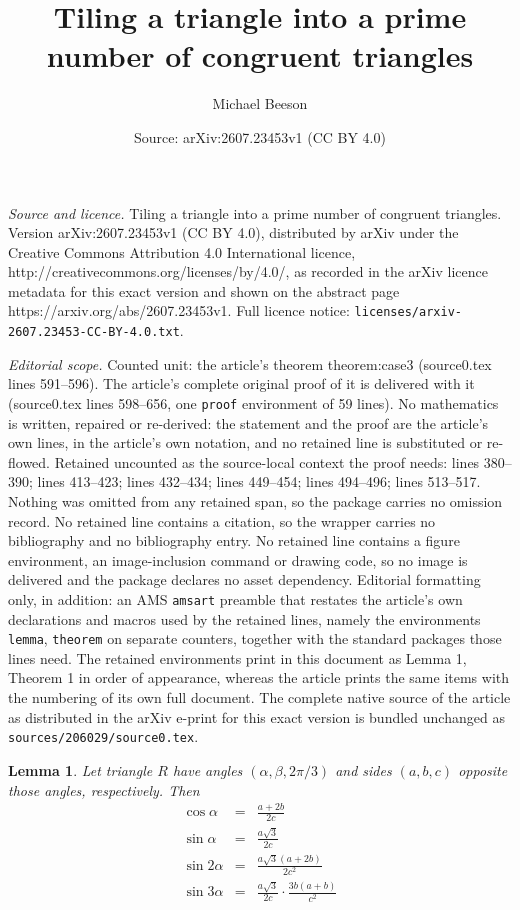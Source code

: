\documentclass[10pt,a4paper]{amsart}
\title{Tiling a triangle into a prime number of congruent triangles}
\author{Michael Beeson}
\date{Source: arXiv:2607.23453v1 (CC BY 4.0)}
\newtheorem{lemma}{Lemma}
\begin{document}
\maketitle

\noindent\emph{Source and licence.} Tiling a triangle into a prime number of congruent triangles. Version arXiv:2607.23453v1 (CC BY 4.0), distributed by arXiv under the Creative Commons Attribution 4.0 International licence, http://creativecommons.org/licenses/by/4.0/, as recorded in the arXiv licence metadata for this exact version and shown on the abstract page https://arxiv.org/abs/2607.23453v1. Full licence notice: \texttt{licenses/arxiv-2607.23453-CC-BY-4.0.txt}.\par\smallskip

\noindent\textit{Editorial scope.} Counted unit: the article's theorem theorem:case3 (source0.tex lines 591--596). The article's complete original proof of it is delivered with it (source0.tex lines 598--656, one \texttt{proof} environment of 59 lines). No mathematics is written, repaired or re-derived: the statement and the proof are the article's own lines, in the article's own notation, and no retained line is substituted or re-flowed.  Retained uncounted as the source-local context the proof needs: lines 380--390; lines 413--423; lines 432--434; lines 449--454; lines 494--496; lines 513--517.  Nothing was omitted from any retained span, so the package carries no omission record.  No retained line contains a citation, so the wrapper carries no bibliography and no bibliography entry.  No retained line contains a figure environment, an image-inclusion command or drawing code, so no image is delivered and the package declares no asset dependency.  Editorial formatting only, in addition: an AMS \texttt{amsart} preamble that restates the article's own declarations and macros used by the retained lines, namely the environments \texttt{lemma}, \texttt{theorem} on separate counters, together with the standard packages those lines need.  The retained environments print in this document as Lemma 1, Theorem 1 in order of appearance, whereas the article prints the same items with the numbering of its own full document.  The complete native source of the article as distributed in the arXiv e-print for this exact version is bundled unchanged as \texttt{sources/206029/source0.tex}.
\begin{lemma} \label{lemma:claude}
Let triangle $R$ have angles $(\alpha,\beta,2\pi/3)$ and sides $(a,b,c)$ opposite
those angles, respectively. Then
\begin{eqnarray*}
\cos \alpha &=& \frac{a+2b} {2c} \\
\sin \alpha &=& \frac {a \sqrt 3}{2c}\\
\sin 2 \alpha &=& \frac {a \sqrt 3 (a+2b)}{2c^2}\\
\sin 3 \alpha 
&=&  \frac {a \sqrt 3}{2c} \cdot\frac {3b(a+b)}{c^2}
\end{eqnarray*}
\end{lemma}
\end{document}
